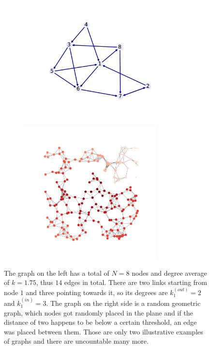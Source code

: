 \begin{figure}
	\begin{subfigure}{0.5\textwidth}
		\includegraphics[width=0.9\textwidth]{Plots/graph_example}
	\end{subfigure}
	\begin{subfigure}{0.5\textwidth}
		\includegraphics[width=0.8\textwidth]{Plots/graph_example2}
	\end{subfigure}
	\caption{The graph on the left has a total of $ N = 8 $ nodes and degree average of $ k = 1.75$, thus $ 14 $ edges in total. There are two links starting from node $ 1 $ and three pointing towards it, so its degrees are $ k^{(out)}_1 = 2 $ and $ k^{(in)}_1 = 3 $. The graph on the right side is a random geometric graph, which nodes got randomly placed in the plane and if the distance of two happens to be below a certain threshold, an edge was placed between them. Those are only two illustrative examples of graphs and there are uncountable many more.}
	\label{fig:graph_example}
\end{figure}

